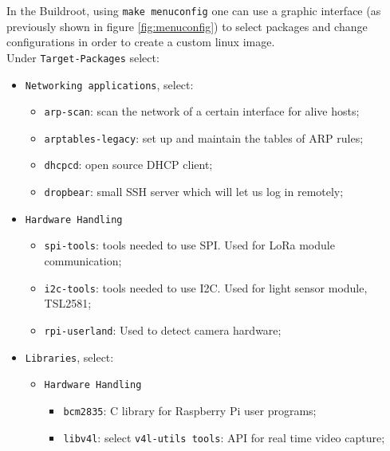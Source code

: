 \label{systemConfig}

In the Buildroot, using \verb|make menuconfig| one can use a graphic interface (as previously shown in figure \ref{fig:menuconfig}) to select packages and change configurations in order to create a custom linux image.\\

Under \verb|Target-Packages| select:
\begin{itemize}
	
	\item \verb|Networking applications|, select:
	\begin{itemize}
		\item \verb|arp-scan|: scan the network of a certain interface for alive hosts;
		\item \verb|arptables-legacy|: set up and maintain the tables of ARP rules;
		\item \verb|dhcpcd|: open source DHCP client;
		\item \verb|dropbear|: small SSH server which will let us log in remotely;
	\end{itemize}
	
	\item \verb|Hardware Handling|
	\begin{itemize}
		\item \verb|spi-tools|: tools needed to use SPI. Used for LoRa module communication;
		\item \verb|i2c-tools|: tools needed to use I2C. Used for light sensor module, TSL2581;
		\item \verb|rpi-userland|: Used to detect camera hardware;
	\end{itemize}
	
	\item \verb|Libraries|, select:
	\begin{itemize}
		\item \verb|Hardware Handling|
		\begin{itemize}
			\item \verb|bcm2835|: C library for Raspberry Pi user programs;
			\item \verb|libv4l|: select \verb|v4l-utils tools|: API for real time video capture;
		\end{itemize}
		

\end{itemize}
\end{itemize}
